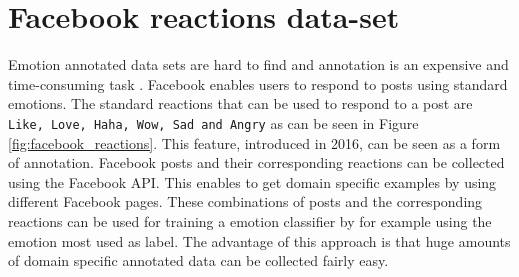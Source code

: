 \documentclass[
10pt, %
a4paper, %
oneside, %
headinclude,footinclude, %
BCOR5mm, %
]{scrartcl}
\begin{document}


  
  
\newpage  
\section{Facebook reactions data-set}
Emotion annotated data sets are hard to find and annotation is an expensive and time-consuming task \citep{kim2010evaluation}. Facebook enables users to respond to posts using standard emotions. The standard reactions that can be used to respond to a post are \texttt{Like, Love, Haha, Wow, Sad and Angry} as can be seen in Figure \ref{fig:facebook_reactions}. This feature, introduced in 2016, can be seen as a form of annotation. Facebook posts and their corresponding reactions can be collected using the Facebook API. This enables to get domain specific examples by using different Facebook pages. These combinations of posts and the corresponding reactions can be used for training a emotion classifier by for example using the emotion most used as label. The advantage of this approach is that huge amounts of domain specific annotated data can be collected fairly easy. 
\end{document}

